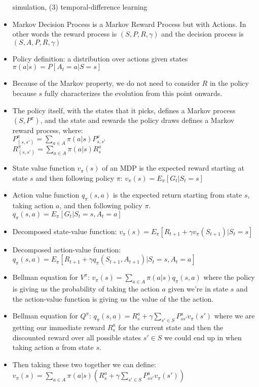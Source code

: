 \documentclass[12pt]{article}
\begin{document}
\begin{itemize}
    simulation, (3) temporal-difference learning
    \item Markov Decision Process is a Markov Reward Process but with Actions. In other
    words the reward process is $(S, P, R, \gamma)$ and the decision process is $(S, A, P, R, \gamma)$
    \item Policy definition: a distribution over actions given states $\pi(a | s) = P[A_t = a | S = s]$
    \item Because of the Markov property, we do not need to consider $R$ in the policy because $s$ fully
    characterizes the evolution from this point onwards.
    \item The policy itself, with the states that it picks, defines a Markov process $(S, P^\pi)$, and 
    the state and rewards the policy draws defines a Markov reward process, where: \\
    $P^\pi_{(s, s')} = \sum_{a \in A}\pi(a | s)P^a_{s, s'}$ \\
    $R^\pi_{(s, s')} = \sum_{a \in A}\pi(a | s)R^a_{s}$
    \item State value function $v_\pi(s)$ of an MDP is the expected reward starting at state $s$
    and then following policy $\pi$: $v_\pi(s) = E_\pi[G_t | S_t = s]$
    \item Action value function $q_\pi(s,a)$ is the expected return starting from state $s$, taking action $a$,
    and then following policy $\pi$. $q_\pi(s,a) = E_\pi[G_t | S_t = s, A_t = a]$
    \item Decomposed state-value function: $v_\pi(s) = E_\pi[R_{t+1} + \gamma v_\pi(S_{t+1}) | S_t = s]$
    \item Decomposed action-value function: $q_\pi(s,a) = E_\pi[R_{t+1} + \gamma q_\pi(S_{t+1}, A_{t+1}) | S_t = s, A_t = a]$
    \item Bellman equation for $V^\pi$: $v_\pi(s) = \sum_{a \in A}\pi(a | s)q_\pi(s, a)$ where the policy is giving us the probability
    of taking the action $a$ given we're in state $s$ and the action-value function is giving us the value of the the action.
    \item Bellman equation for $Q^\pi$: $q_\pi(s, a) = R_s^a + \gamma \sum_{s' \in S}P_{ss'}^a v_\pi(s')$ where
    we are getting our immediate reward $R_s^a$ for the current state and then the discounted reward over all possible states $s' \in S$ we could end
    up in when taking action $a$ from state $s$.
    \item Then taking these two together we can define: \\
    $v_\pi(s) = \sum_{a \in A}\pi(a | s)(R_s^a + \gamma \sum_{s' \in S}P_{ss'}^a v_\pi(s'))$ \\

\end{itemize}
\end{document}
